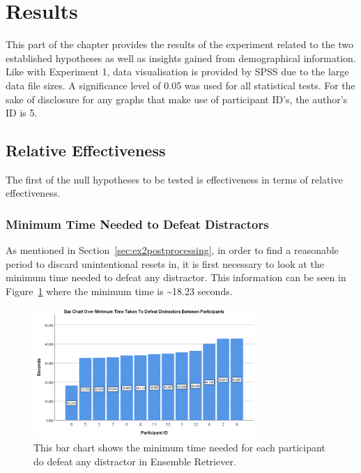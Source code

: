 \section{Results}
This part of the chapter provides the results of the experiment related to the two established hypotheses as well as insights gained from demographical information. Like with Experiment 1, data visualisation is provided by SPSS due to the large data file sizes. A significance level of 0.05 was used for all statistical tests. For the sake of disclosure for any graphs that make use of participant ID's, the author's ID is 5. 

\subsection{Relative Effectiveness}
The first of the null hypotheses to be tested is effectiveness in terms of relative effectiveness. 

\subsubsection{Minimum Time Needed to Defeat Distractors}
As mentioned in Section~\ref{sec:ex2postprocessing}, in order to find a reasonable period to discard unintentional resets in, it is first necessary to look at the minimum time needed to defeat any distractor. This information can be seen in Figure~\ref{fig:minDistractorDefeatTime} where the minimum time is \textasciitilde18.23 seconds.

\begin{figure}[tbph]
    \centering
    \includegraphics[width=0.75\textwidth]{figures/graphs/MinDistractorDefeatTime.png}
    \caption[Minimum Time Needed To Defeat Distractors Between Participants]{This bar chart shows the minimum time needed for each participant do defeat any distractor in Ensemble Retriever.}
    \label{fig:minDistractorDefeatTime}
\end{figure}

